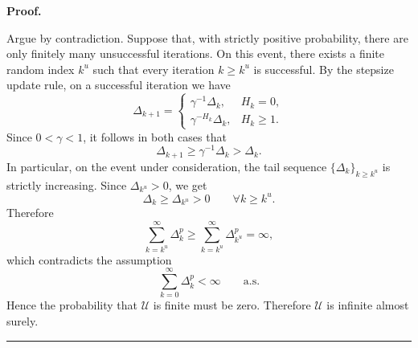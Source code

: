 \documentclass[11pt,a4paper]{article}
\newtheorem{lemma}{Lemma}[section]
\newenvironment{proof}[1][Proof]{%
  \par\noindent\textbf{#1.}\ %
}{%
  \par\vspace{-0.5 ex}            %
  \noindent\hfill\rule{0.5em}{0.5em}\par
  \vspace{1ex}
}
\newcommand{\Dexp}{p}
\begin{document}
\begin{proof}
Argue by contradiction. Suppose that, with strictly positive probability,
there are only finitely many unsuccessful iterations. On this event, there
exists a finite random index $k^u$ such that every iteration $k\ge k^u$ is
successful. By the stepsize update rule, on a successful iteration we have
\[
\Delta_{k+1}
=
\begin{cases}
    \gamma^{-1}\Delta_k, & H_k=0,\\[1mm]
    \gamma^{-H_k}\Delta_k, & H_k\ge1.
\end{cases}
\]
Since $0<\gamma<1$, it follows in both cases that
\[
    \Delta_{k+1}\ge \gamma^{-1}\Delta_k>\Delta_k .
\]
In particular, on the event under consideration, the tail sequence
$\{\Delta_k\}_{k\ge k^u}$ is strictly increasing. Since $\Delta_{k^u}>0$, we get
\[
    \Delta_k\ge \Delta_{k^u}>0
    \qquad \forall k\ge k^u .
\]
Therefore
\[
    \sum_{k=k^u}^{\infty}\Delta_k^{\Dexp}
    \ge
    \sum_{k=k^u}^{\infty}\Delta_{k^u}^{\Dexp}
    =
    \infty,
\]
which contradicts the assumption
\[
    \sum_{k=0}^{\infty}\Delta_k^{\Dexp}<\infty
    \qquad \text{a.s.}
\]
Hence the probability that $\mathcal U$ is finite must be zero. Therefore
$\mathcal U$ is infinite almost surely.
\end{proof}
\noindent
\end{document}
